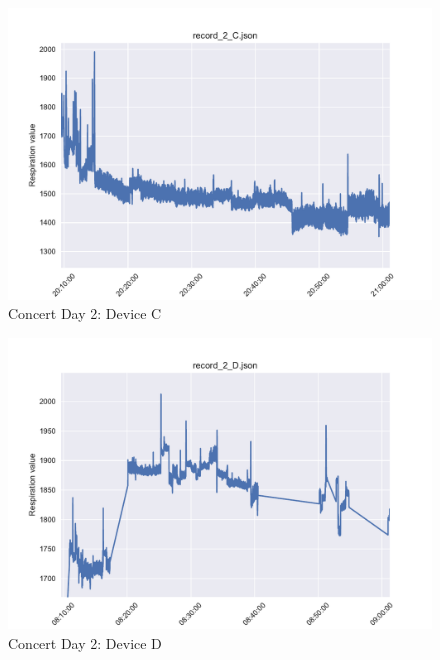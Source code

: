 \begin{figure}
    \centering
    \includegraphics[scale=0.6]{images/record_2_c.pdf}
    \caption{Concert Day 2: Device C}
    \label{fig:concert_day2_c}
\end{figure}

\begin{figure}
    \centering
    \includegraphics[scale=0.6]{images/record_2_d.pdf}
    \caption{Concert Day 2: Device D}
    \label{fig:concert_day2_d}
\end{figure}

